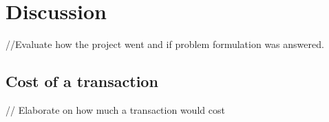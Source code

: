 \section{Discussion}

//Evaluate how the project went and if problem formulation was answered.

\subsection{Cost of a transaction}

// Elaborate on how much a transaction would cost